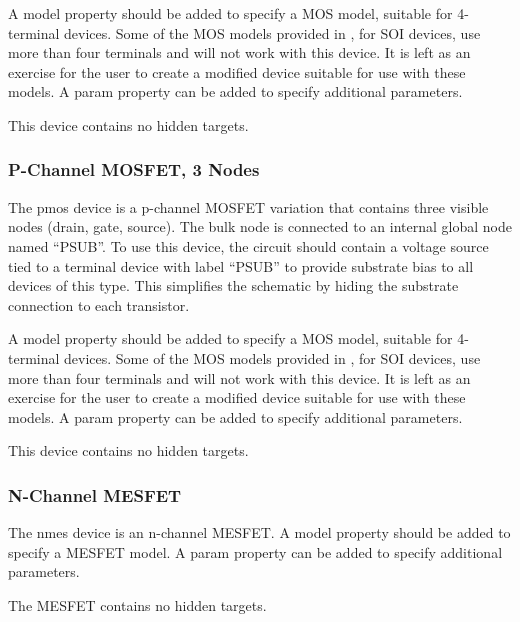 A {\et model} property should be added to specify a MOS model,
suitable for 4-terminal devices.  Some of the MOS models provided in
{\WRspice}, for SOI devices, use more than four terminals and will not
work with this device.  It is left as an exercise for the user to
create a modified device suitable for use with these models.  A {\et
param} property can be added to specify additional parameters.

This device contains no hidden targets.

\subsubsection{P-Channel MOSFET, 3 Nodes}

The {\et pmos} device is a p-channel MOSFET variation that contains
three visible nodes (drain, gate, source).  The bulk node is connected
to an internal global node named ``PSUB''.  To use this device, the
circuit should contain a voltage source tied to a terminal device with
label ``PSUB'' to provide substrate bias to all devices of this type. 
This simplifies the schematic by hiding the substrate connection to
each transistor.

A {\et model} property should be added to specify a MOS model,
suitable for 4-terminal devices.  Some of the MOS models provided in
{\WRspice}, for SOI devices, use more than four terminals and will not
work with this device.  It is left as an exercise for the user to
create a modified device suitable for use with these models.  A {\et
param} property can be added to specify additional parameters.

This device contains no hidden targets.

\subsubsection{N-Channel MESFET}

The {\et nmes} device is an n-channel MESFET.  A {\et model} property
should be added to specify a MESFET model.  A {\et param} property can
be added to specify additional parameters.

The MESFET contains no hidden targets.

